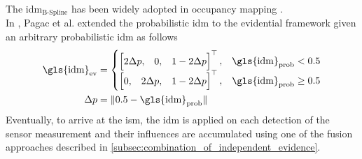The \gls{idm}$_{\text{B-Spline}}$ has been widely adopted in occupancy mapping \cite{mouhagir2017using,reineking2013evidential,yu2015evidential}.
\\
In \cite{pagac1996evidential}, Pagac et al. extended the probabilistic \gls{idm} to the evidential framework given an arbitrary probabilistic \gls{idm} as follows  
\begin{align}
	\label{eq:ev_ray_casting_model}
	\text{\gls{idm}}_{\text{ev}} &=
	\begin{cases}
		\begin{bmatrix} 2\Delta p, &0, &1 - 2\Delta p \end{bmatrix}^{\top}, & \text{\gls{idm}}_{\text{prob}} < 0.5 \\
		\begin{bmatrix} 0, &2\Delta p, &1 - 2\Delta p \end{bmatrix}^{\top}, & \text{\gls{idm}}_{\text{prob}} \geq 0.5
	\end{cases}\\
	\Delta p &= \| 0.5 - \text{\gls{idm}}_{\text{prob}} \|
\end{align}
Eventually, to arrive at the \gls{ism}, the \gls{idm} is applied on each detection of the sensor measurement and their influences are accumulated using one of the fusion approaches described in \ref{subsec:combination_of_independent_evidence}.
%
